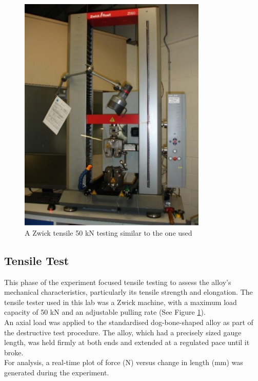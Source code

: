 \documentclass{article}
\begin{document}
\begin{minipage}{0.4\textwidth}
    \begin{figure}[H]
    \centering
    \includegraphics[width=0.8\textwidth]{images/tensile_machine.jpg}
    \caption{A Zwick tensile 50 kN testing similar to the one used}
    \label{fig:tensile_machine}
    \end{figure}
\end{minipage}\hfill
\begin{minipage}{0.555\textwidth}
\subsection{Tensile Test}
This phase of the experiment focused tensile testing to assess the alloy's mechanical characteristics, particularly its tensile strength and elongation. The tensile tester used in this lab was a {Zwick machine}, with a maximum load capacity of 50 kN and an adjustable pulling rate (See Figure \ref{fig:tensile_machine}).\\[8pt]
An axial load was applied to the standardised dog-bone-shaped alloy as part of the destructive test procedure. The alloy, which had a precisely sized gauge length, was held firmly at both ends and extended at a regulated pace until it broke.\\[8pt]
For analysis, a real-time plot of force (N) versus change in length (mm) was generated during the experiment.
\end{minipage}\\[8pt]
\end{document}
